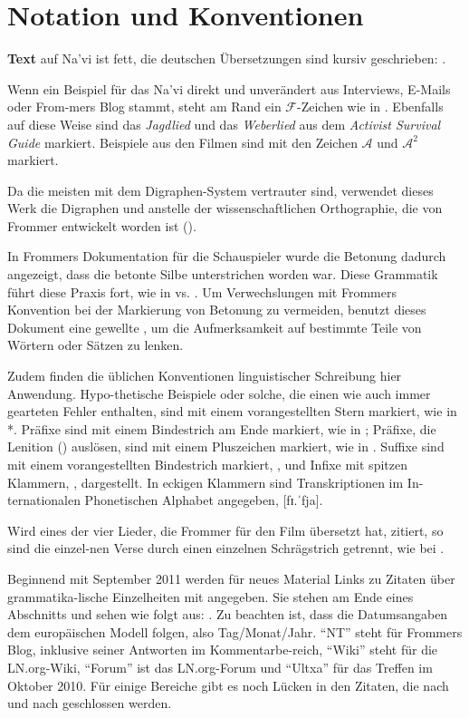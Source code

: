 \section{Notation und Konventionen}

\textbf{Text} auf Na'vi ist fett, die deutschen Übersetzungen sind kursiv geschrieben:  .

Wenn ein Beispiel für das Na'vi direkt und unverändert aus Interviews, E-Mails oder From-mers Blog stammt, steht am Rand ein $\mathcal{F}$-Zeichen wie in . Ebenfalls auf diese Weise sind das \textit{Jagdlied} und das \textit{Weberlied} aus dem \textit{Activist Survival Guide} markiert. Beispiele aus den Filmen sind mit den Zeichen $\mathcal{A}$ und $\mathcal{A}^2$ markiert.

Da die meisten mit dem Digraphen-System vertrauter sind, verwendet dieses Werk die Digraphen  und  anstelle der wissenschaftlichen Orthographie, die von Frommer entwickelt worden ist ().

In Frommers Dokumentation für die Schauspieler wurde die Betonung dadurch angezeigt, dass die betonte Silbe unterstrichen worden war. Diese Grammatik führt diese Praxis fort, wie in   vs.  . Um Verwechslungen mit Frommers Konvention bei der Markierung von Betonung zu vermeiden, benutzt dieses Dokument eine gewellte , um die Aufmerksamkeit auf bestimmte Teile von Wörtern oder Sätzen zu lenken.

Zudem finden die üblichen Konventionen linguistischer Schreibung hier Anwendung. Hypo-thetische Beispiele oder solche, die einen wie auch immer gearteten Fehler enthalten, sind mit einem vorangestellten Stern markiert, wie in *. Präfixe sind mit einem Bindestrich am Ende markiert, wie in ; Präfixe, die Lenition () auslösen, sind mit einem Pluszeichen markiert, wie in . Suffixe sind mit einem vorangestellten Bindestrich markiert, , und Infixe mit spitzen Klammern, , dargestellt. In eckigen Klammern sind Transkriptionen im In-ternationalen Phonetischen Alphabet angegeben, [fɪ.ˈfja].

Wird eines der vier Lieder, die Frommer für den Film übersetzt hat, zitiert, so sind die einzel-nen Verse durch einen einzelnen Schrägstrich getrennt, wie bei .

Beginnend mit September 2011 werden für neues Material Links zu Zitaten über grammatika-lische Einzelheiten mit angegeben. Sie stehen am Ende eines Abschnitts und sehen wie folgt aus: . Zu beachten ist, dass die Datumsangaben dem europäischen Modell folgen, also Tag/Monat/Jahr. ``NT'' steht für Frommers Blog, inklusive seiner Antworten im Kommentarbe-reich, ``Wiki'' steht für die LN.org-Wiki, ``Forum'' ist das LN.org-Forum und ``Ultxa'' für das Treffen im Oktober 2010. Für einige Bereiche gibt es noch Lücken in den Zitaten, die nach und nach geschlossen werden.

